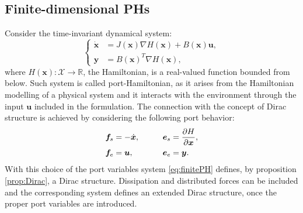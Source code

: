 \documentclass[preprint,12pt]{elsarticle}
\begin{document}
{\subsection{Finite-dimensional PHs}
Consider the time-invariant dynamical system:
\begin{equation}
\label{eq:finitePH}
\begin{cases}
\dot{ \bm{x} } &= J(\bm{x}) \nabla H(\bm{x}) + B(\bm{x})\bm{u}, \\
\bm{y} &= B(\bm{x})^T \nabla H(\bm{x}),
\end{cases}
\end{equation}
where $ H(\bm{x}) : \mathcal{X} \rightarrow \mathbb{R} $, the Hamiltonian, is a real-valued function bounded from below. Such system is called port-Hamiltonian, as it arises from the Hamiltonian modelling of a physical system and it interacts with the environment through the input $\bm{u}$ included in the formulation. The connection with the concept of Dirac structure is achieved by considering the following port behavior:
\begin{equation}
\begin{aligned}
\bm{f}_s &= - \dot{ \bm{x} }, \qquad 
&\bm{e}_s &= \diffp{H}{\bm{x}}, \\
\bm{f}_e &= \bm{u}, \qquad
&\bm{e}_e &= \bm{y}. \\
\end{aligned}
\end{equation}
With this choice of the port variables system \eqref{eq:finitePH} defines, by proposition \ref{prop:Dirac}, a Dirac structure. Dissipation and distributed forces can be included and the corresponding system defines an extended Dirac structure, once the proper port variables are introduced.
}
\end{document}
